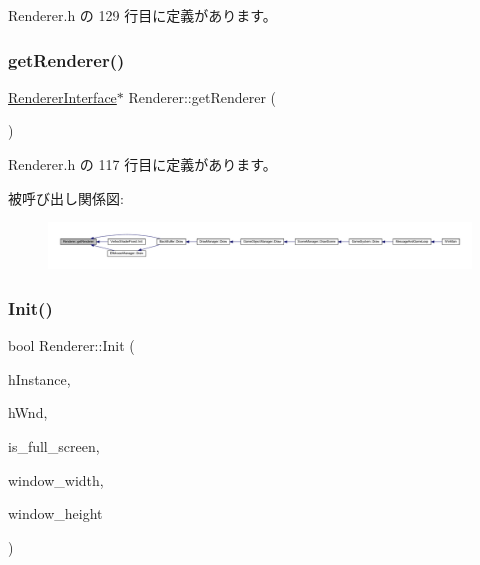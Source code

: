  Renderer.\+h の 129 行目に定義があります。

\mbox{\label{class_renderer_a581267c3eeedce9b333c119d009e315c}} 
\subsubsection{\texorpdfstring{get\+Renderer()}{getRenderer()}}
{\footnotesize\ttfamily \mbox{\hyperlink{class_renderer_interface}{Renderer\+Interface}}$\ast$ Renderer\+::get\+Renderer (\begin{DoxyParamCaption}{ }\end{DoxyParamCaption})\hspace{0.3cm}{\ttfamily [inline]}}



 Renderer.\+h の 117 行目に定義があります。

被呼び出し関係図\+:
\nopagebreak
\begin{figure}[H]
\begin{center}
\leavevmode
\includegraphics[width=350pt]{class_renderer_a581267c3eeedce9b333c119d009e315c_icgraph}
\end{center}
\end{figure}
\mbox{\label{class_renderer_a8d576add80187f5be3f24ec6a8108100}} 
\subsubsection{\texorpdfstring{Init()}{Init()}}
{\footnotesize\ttfamily bool Renderer\+::\+Init (\begin{DoxyParamCaption}\item[{H\+I\+N\+S\+T\+A\+N\+CE}]{h\+Instance,  }\item[{H\+W\+ND}]{h\+Wnd,  }\item[{B\+O\+OL}]{is\+\_\+full\+\_\+screen,  }\item[{int}]{window\+\_\+width,  }\item[{int}]{window\+\_\+height }\end{DoxyParamCaption})}



